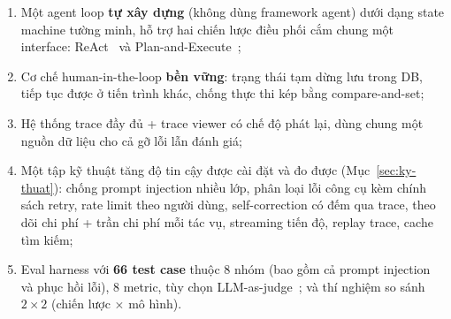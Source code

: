 \begin{enumerate}
  \item Một agent loop \textbf{tự xây dựng} (không dùng framework agent) dưới
        dạng state machine tường minh, hỗ trợ hai chiến lược điều phối cắm
        chung một interface: ReAct~\cite{yao2023react} và
        Plan-and-Execute~\cite{wang2023planandsolve};
  \item Cơ chế human-in-the-loop \textbf{bền vững}: trạng thái tạm dừng lưu
        trong DB, tiếp tục được ở tiến trình khác, chống thực thi kép bằng
        compare-and-set;
  \item Hệ thống trace đầy đủ + trace viewer có chế độ phát lại, dùng chung
        một nguồn dữ liệu cho cả gỡ lỗi lẫn đánh giá;
  \item Một tập kỹ thuật tăng độ tin cậy được cài đặt và đo được
        (Mục~\ref{sec:ky-thuat}): chống prompt injection nhiều lớp, phân loại
        lỗi công cụ kèm chính sách retry, rate limit theo người dùng,
        self-correction có đếm qua trace, theo dõi chi phí + trần chi phí mỗi
        tác vụ, streaming tiến độ, replay trace, cache tìm kiếm;
  \item Eval harness với \textbf{66 test case} thuộc 8 nhóm (bao gồm cả prompt
        injection và phục hồi lỗi), 8 metric, tùy chọn
        LLM-as-judge~\cite{zheng2023judge}; và thí nghiệm so sánh
        $2 \times 2$ (chiến lược $\times$ mô hình).
\end{enumerate}
